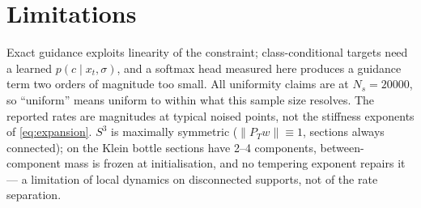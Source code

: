 \documentclass[10pt]{article}
\theoremstyle{definition}
\theoremstyle{plain}
\begin{document}
\section{Limitations}

Exact guidance exploits linearity of the constraint; class-conditional targets
need a learned $p(c\mid x_t,\sigma)$, and a softmax head measured here produces a
guidance term two orders of magnitude too small. All uniformity claims are at
$N_s = 20000$, so ``uniform'' means uniform to within what this sample size
resolves. The reported rates are magnitudes at typical noised points, not the
stiffness exponents of \eqref{eq:expansion}. $S^3$ is maximally symmetric
($\|P_{T}w\| \equiv 1$, sections always connected); on the Klein bottle sections
have 2--4 components, between-component mass is frozen at initialisation, and no
tempering exponent repairs it --- a limitation of local dynamics on disconnected
supports, not of the rate separation.
\end{document}
